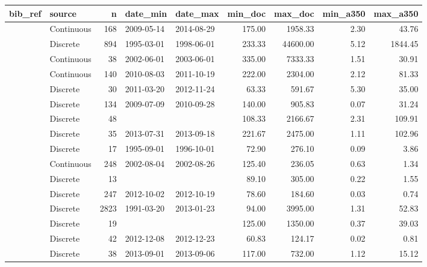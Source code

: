 \begin{table}[ht]
\centering
\begingroup\footnotesize
\begin{tabular}{llrllrrrr}
  \hline
bib\_ref & source & n & date\_min & date\_max & min\_doc & max\_doc & min\_a350 & max\_a350 \\ 
  \hline
\citet{agro} & Continuous & 168 & 2009-05-14 & 2014-08-29 & 175.00 & 1958.33 & 2.30 & 43.76 \\ 
  \citet{Aiken2005} & Discrete & 894 & 1995-03-01 & 1998-06-01 & 233.33 & 44600.00 & 5.12 & 1844.45 \\ 
  \citet{Anderson2007} & Continuous &  38 & 2002-06-01 & 2003-06-01 & 335.00 & 7333.33 & 1.51 & 30.91 \\ 
  \citet{Asmala2014} & Continuous & 140 & 2010-08-03 & 2011-10-19 & 222.00 & 2304.00 & 2.12 & 81.33 \\ 
  \citet{Bouillon2014} & Discrete &  30 & 2011-03-20 & 2012-11-24 & 63.33 & 591.67 & 5.30 & 35.00 \\ 
  \citet{Braun2015} & Discrete & 134 & 2009-07-09 & 2010-09-28 & 140.00 & 905.83 & 0.07 & 31.24 \\ 
  \citet{Breton2009} & Discrete &  48 &  &  & 108.33 & 2166.67 & 2.31 & 109.91 \\ 
  \citet{Brezonik2015} & Discrete &  35 & 2013-07-31 & 2013-09-18 & 221.67 & 2475.00 & 1.11 & 102.96 \\ 
  \citet{Castillo1999} & Discrete &  17 & 1995-09-01 & 1996-10-01 & 72.90 & 276.10 & 0.09 & 3.86 \\ 
  \citet{Conan2007} & Continuous & 248 & 2002-08-04 & 2002-08-26 & 125.40 & 236.05 & 0.63 & 1.34 \\ 
  \citet{Delcastillo2000} & Discrete &  13 &  &  & 89.10 & 305.00 & 0.22 & 1.55 \\ 
  \citet{Engel2015} & Discrete & 247 & 2012-10-02 & 2012-10-19 & 78.60 & 184.60 & 0.03 & 0.74 \\ 
  \citet{finish_rivers} & Discrete & 2823 & 1991-03-20 & 2013-01-23 & 94.00 & 3995.00 & 1.31 & 52.83 \\ 
  \citet{Forsstrom2015} & Discrete &  19 &  &  & 125.00 & 1350.00 & 0.37 & 39.03 \\ 
  \citet{Galgani2016} & Discrete &  42 & 2012-12-08 & 2012-12-23 & 60.83 & 124.17 & 0.02 & 0.81 \\ 
  \citet{Goncalves2015} & Discrete &  38 & 2013-09-01 & 2013-09-06 & 117.00 & 732.00 & 1.12 & 15.12 \\ 

\end{tabular}
\end{table}
